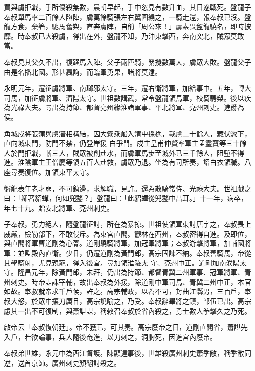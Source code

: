 \begin{pinyinscope}
 買與虜拒戰，手所傷殺無數，晨朝早起，手中忽見有數升血，其日遂戰死。盤龍子奉叔單馬率二百餘人陷陣，虜萬餘騎張左右翼圍繞之，一騎走還，報奉叔已沒。盤龍方食，棄箸，馳馬奮槊，直奔虜陣，自稱「周公來！」虜素畏盤龍驍名，即時披靡。時奉叔已大殺虜，得出在外，盤龍不知，乃沖東擊西，奔南突北，賊眾莫敢當。



 奉叔見其父久不出，復躍馬入陣。父子兩匹騎，縈攪數萬人，虜眾大敗。盤龍父子由是名播北國。形甚羸訥，而臨軍勇果，諸將莫逮。



 永明元年，遷征虜將軍、南瑯邪太守。三年，遷右衛將軍，加給事中。五年，轉大司馬，加征虜將軍、濟陽太守。世祖數講武，常令盤龍領馬軍，校騎騁槊。後以疾為光祿大夫。尋出為持節、都督兗州緣淮諸軍事、平北將軍、兗州刺史。進爵為侯。



 角城戍將張蒲與虜潛相構結，因大霧乘船入清中採樵，載虜二十餘人，藏伏惣下，直向城東門，防門不禁，仍登岸援
 白爭門。戍主皇甫仲賢率軍主孟靈寶等三十餘人於門拒戰，斬三人，賊眾被創赴水，而虜軍馬步至城外已三千餘人，阻塹不得進。淮陰軍主王僧慶等領五百人赴救，虜眾乃退。坐為有司所奏，詔白衣領職。八座尋奏復位。加領東平太守。



 盤龍表年老才弱，不可鎮邊，求解職，見許。還為散騎常侍、光祿大夫。世祖戲之曰：「卿著貂蟬，何如兜鍪？」盤龍曰：「此貂蟬從兜鍪中出耳。」十一年，病卒，年七十九。贈安北將軍、兗州刺史。



 子奉叔，勇力絕人，隨盤龍征討，所在為暴掠。世祖使領軍東討唐宇之，奉叔畏上威嚴，檢勒部下，不敢侵斥。為東宮直閣。鬱林在西州，奉叔密得自進。及即位，與直閣將軍曹道剛為心膂。道剛驍騎將軍，加冠軍將軍；奉叔游擊將軍，加輔國將軍：並監殿內直衛。少日，仍遷道剛為黃門郎，高宗固諫不納。奉叔善騎馬，帝從其學騎射，尤見親寵，得入後宮。尋加領淮陵太
 守、兗州中正。道剛加南濮陽太守。隆昌元年，除黃門郎，未拜，仍出為持節、都督青冀二州軍事、冠軍將軍、青州刺史。時帝謀誅宰輔，故出奉叔為外援，除道剛中軍司馬、青冀二州中正，本官如故。奉叔就帝求千戶侯，許之。高宗輔政，以為不可，封曲江縣男，三百戶，奉叔大怒，於眾中攘刀厲目，高宗說喻之，乃受。奉叔辭畢將之鎮，部伍已出。高宗慮其一出不可復制，與蕭諶謀，稱敕召奉叔於省內殺之，勇士數人拳擊久之乃死。



 啟帝云「奉叔慢朝廷」。帝不獲已，可其奏。高宗廢帝之日，道剛直閣省，蕭諶先入戶，若欲論事，兵人隨後奄進，以刀刺之，洞胸死，因進宮內廢帝。



 奉叔弟世雄，永元中為西江督護。陳顯達事後，世雄殺廣州刺史蕭季敞，稱季敞同逆，送首京師。廣州刺史顏翻討殺之。




\end{pinyinscope}
